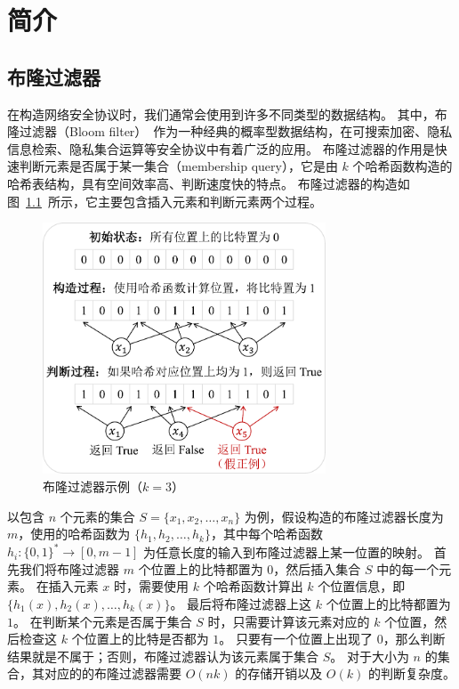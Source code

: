 
\chapter{简介}

\section{布隆过滤器}

在构造网络安全协议时，我们通常会使用到许多不同类型的数据结构。
其中，布隆过滤器（Bloom filter）~\cite{bloom1970space}作为一种经典的概率型数据结构，在可搜索加密、隐私信息检索、隐私集合运算等安全协议中有着广泛的应用。
布隆过滤器的作用是快速判断元素是否属于某一集合（membership query），它是由 $k$ 个哈希函数构造的哈希表结构，具有空间效率高、判断速度快的特点。
布隆过滤器的构造如图~\ref{fig:Bloom_example}~所示，它主要包含插入元素和判断元素两个过程。
\begin{figure}[ht]
  \centering
  \includegraphics[width=0.75\textwidth]{figures/Bloom_filter.pdf}
  \caption{布隆过滤器示例（$k=3$）}
  \label{fig:Bloom_example}
\end{figure}
以包含 $n$ 个元素的集合 $S=\{x_1, x_2, \dots, x_n\}$ 为例，假设构造的布隆过滤器长度为 $m$，使用的哈希函数为 $\{h_1, h_2, \dots, h_k\}$，其中每个哈希函数 $h_i:\{0,1\}^* \to [0, m-1]$ 为任意长度的输入到布隆过滤器上某一位置的映射。
首先我们将布隆过滤器 $m$ 个位置上的比特都置为 $0$，然后插入集合 $S$ 中的每一个元素。
在插入元素 $x$ 时，需要使用 $k$ 个哈希函数计算出 $k$ 个位置信息，即 $\{h_1(x),h_2(x),\dots, h_k(x)\}$。
最后将布隆过滤器上这 $k$ 个位置上的比特都置为 $1$。
在判断某个元素是否属于集合 $S$ 时，只需要计算该元素对应的 $k$ 个位置，然后检查这 $k$ 个位置上的比特是否都为 $1$。
只要有一个位置上出现了 $0$，那么判断结果就是不属于；否则，布隆过滤器认为该元素属于集合 $S$。
对于大小为 $n$ 的集合，其对应的的布隆过滤器需要 $O(nk)$ 的存储开销以及 $O(k)$ 的判断复杂度。

